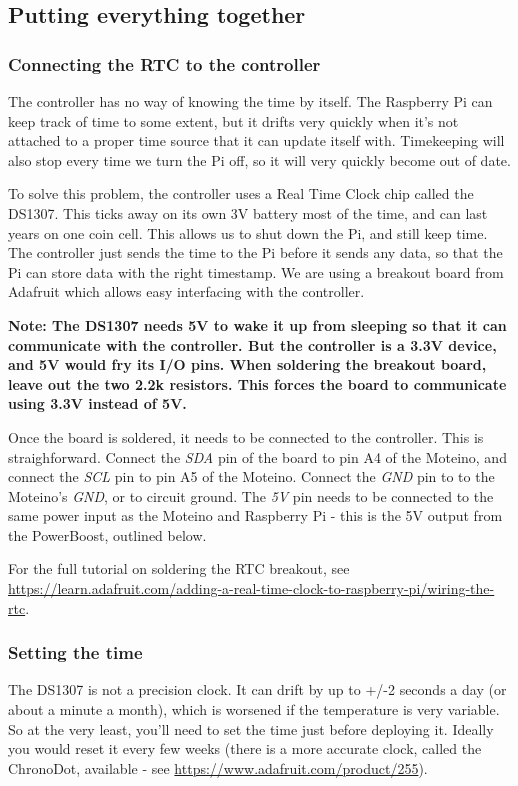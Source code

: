 \documentclass[10pt]{article}
\begin{document}
\subsection{Putting everything together}

\subsubsection{Connecting the RTC to the controller}
The controller has no way of knowing the time by itself. The Raspberry Pi can keep track of time to some extent, but it drifts very quickly when it's not attached to a proper time source that it can update itself with. Timekeeping will also stop every time we turn the Pi off, so it will very quickly become out of date.

To solve this problem, the controller uses a Real Time Clock chip called the DS1307. This ticks away on its own 3V battery most of the time, and can last years on one coin cell. This allows us to shut down the Pi, and still keep time. The controller just sends the time to the Pi before it sends any data, so that the Pi can store data with the right timestamp. We are using a breakout board from Adafruit which allows easy interfacing with the controller. \newline

\textbf{Note: The DS1307 needs 5V to wake it up from sleeping so that it can communicate with the controller. But the controller is a 3.3V device, and 5V would fry its I/O pins. When soldering the breakout board, leave out the two 2.2k resistors. This forces the board to communicate using 3.3V instead of 5V.} \newline

Once the board is soldered, it needs to be connected to the controller. This is straighforward. Connect the \textit{SDA} pin of the board to pin A4 of the Moteino, and connect the \textit{SCL} pin to pin A5 of the Moteino. Connect the \textit{GND} pin to to the Moteino's \textit{GND}, or to circuit ground. The \textit{5V} pin needs to be connected to the same power input as the Moteino and Raspberry Pi - this is the 5V output from the PowerBoost, outlined below.

For the full tutorial on soldering the RTC breakout, see \url{https://learn.adafruit.com/adding-a-real-time-clock-to-raspberry-pi/wiring-the-rtc}.

\subsubsection{Setting the time}
The DS1307 is not a precision clock. It can drift by up to  +/-2 seconds a day (or about a minute a month), which is worsened if the temperature is very variable. So at the very least, you'll need to set the time just before deploying it. Ideally you would reset it every few weeks (there is a more accurate clock, called the ChronoDot, available - see \url{https://www.adafruit.com/product/255}).
\end{document}
